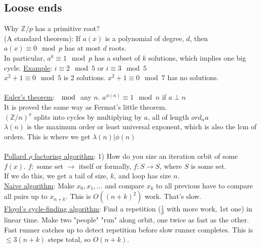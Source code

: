\documentclass[13pt]{article}
\begin{document}
	\subsection*{Loose ends}
		Why $\mathbb{Z}/p$ has a primitive root?\\
		(A standard theorem): If $a(x)$ is a polynomial of degree, $d$, then
		$a(x) \equiv 0 \mod p$ has at most $d$ roots.\\
		In particular, $a^k \equiv 1 \mod p$ has a subset of $k$ solutions, which
		implies one big cycle.
		\underline{Example}: $i \equiv  2 \mod 5$ or $i \equiv 3 \mod 5$\\
		$x^2 + 1 \equiv 0 \mod 5$ is 2 solutions. $x^2 + 1 \equiv 0 \mod 7$ has
		no solutions.\\\\
		\underline{Euler's theorem}: $\mod$ any $n$. $a^{\phi(n)} \equiv 1 \mod
		n$ if $a \perp n$\\
		It is proved the same way as Fermat's little theorem.\\
		$(\mathbb{Z}/n)^x$ splits into cycles by multiplying by $a$, all of
		length $ord_na$\\
		$\lambda(n)$ is the maximum order or least universal exponent, which
		is also the lcm of orders. This is where we get $\lambda(n) | \phi(n)$
		\\\\
		\underline{Pollard $\rho$ factoring algorithm}:
		1) How do you size an iteration orbit of some $f(x)$. $f:$ some set
		$\rightarrow$ itself or formally, $f: S \to S$, where $S$ is some set.\\
		If we do this, we get a tail of size, $k$, and loop has size $n$.\\
		\underline{Naive algorithm}:
			Make $x_0, x_1, \ldots$ and compare $x_k$ to all previous have to 
			compare all pairs up to $x_{n+k}$. This is $O((n+k)^2)$ work. That's
			slow.\\
		\underline{Floyd's cycle-finding algorithm}:
			Find a repetition ($\frac{1}{p}$ with more work, 1st one) in
			linear time. Make two "people" "run" along orbit, one twice as fast as
			the other.\\
			Fast runner catches up to detect repetition before slow runner 
			completes. This is $\le 3(n+k)$ steps total, so $O(n+k)$.
\end{document}

